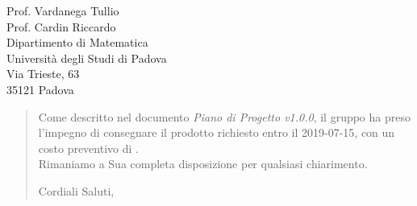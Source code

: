 \begin{letter}{
		Prof. Vardanega Tullio \\
		Prof. Cardin Riccardo \\
		Dipartimento di Matematica \\
		Università degli Studi di Padova \\
		Via Trieste, 63 \\
		35121 Padova}
\begin{quotation}
\noindent Come descritto nel documento \textit{Piano di Progetto v1.0.0}, il gruppo ha preso l'impegno di consegnare il prodotto richiesto entro il 2019-07-15, con un costo preventivo di  \textbf{}.\\
Rimaniamo a Sua completa disposizione per qualsiasi chiarimento.

\vspace{0.5cm}
\closing{ Cordiali Saluti,}
	

\end{quotation}
		
\end{letter}


